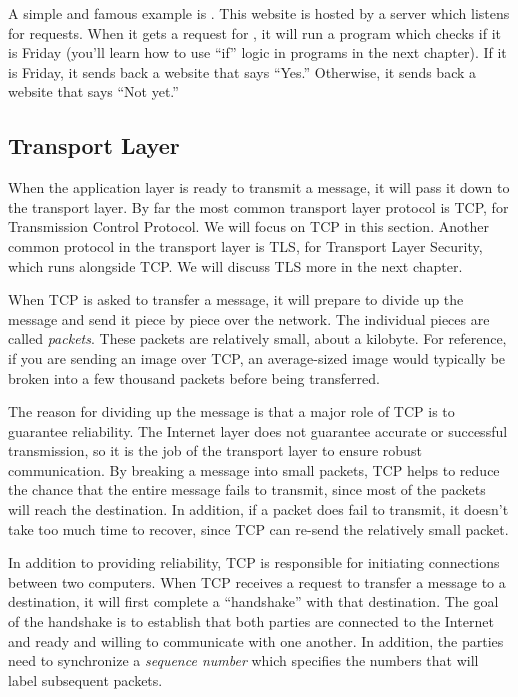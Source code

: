 A simple and famous example is . This website is hosted by a server which listens for requests. When it gets a request for , it will run a program which checks if it is Friday (you'll learn how to use ``if'' logic in programs in the next chapter). If it is Friday, it sends back a website that says ``Yes.'' Otherwise, it sends back a website that says ``Not yet.''

\subsection{Transport Layer}

When the application layer is ready to transmit a message, it will pass it down to the transport layer. By far the most common transport layer protocol is TCP, for Transmission Control Protocol. We will focus on TCP in this section. Another common protocol in the transport layer is TLS, for Transport Layer Security, which runs alongside TCP. We will discuss TLS more in the next chapter.

When TCP is asked to transfer a message, it will prepare to divide up the message and send it piece by piece over the network. The individual pieces are called \emph{packets}. These packets are relatively small, about a kilobyte. For reference, if you are sending an image over TCP, an average-sized image would typically be broken into a few thousand packets before being transferred. 

The reason for dividing up the message is that a major role of TCP is to guarantee reliability. 
The Internet layer does not guarantee accurate or successful transmission, so it is the job of the transport layer to ensure robust communication. By breaking a message into small packets, TCP helps to reduce the chance that the entire message fails to transmit, since most of the packets will reach the destination. In addition, if a packet does fail to transmit, it doesn't take too much time to recover, since TCP can re-send the relatively small packet.

In addition to providing reliability, TCP is responsible for initiating connections between two computers. When TCP receives a request to transfer a message to a destination, it will first complete a ``handshake'' with that destination. The goal of the handshake is to establish that both parties are connected to the Internet and ready and willing to communicate with one another. In addition, the parties need to synchronize a \emph{sequence number} which specifies the numbers that will label subsequent packets.

